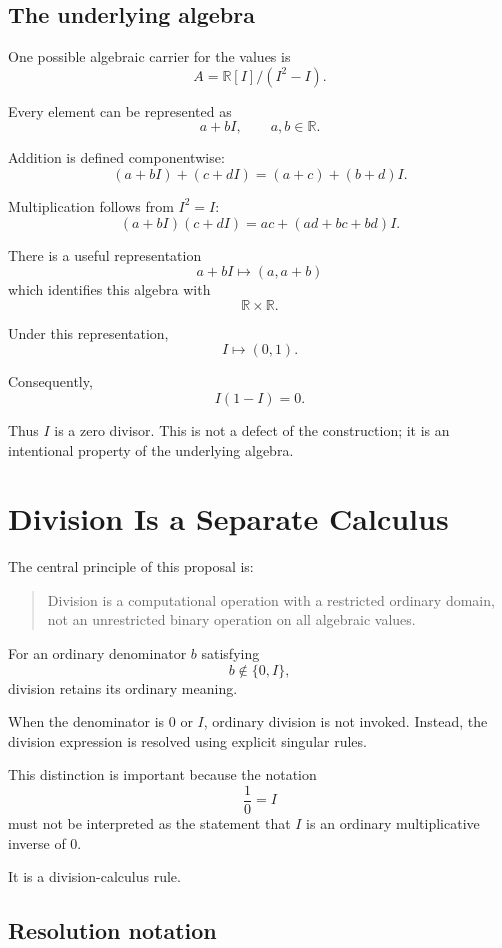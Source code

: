 \documentclass[11pt,a4paper]{article}
\begin{document}
\subsection{The underlying algebra}

One possible algebraic carrier for the values is
\[
A=\mathbb{R}[I]/(I^2-I).
\]

Every element can be represented as
\[
a+bI,\qquad a,b\in\mathbb{R}.
\]

Addition is defined componentwise:
\[
(a+bI)+(c+dI)
=
(a+c)+(b+d)I.
\]

Multiplication follows from $I^2=I$:
\[
(a+bI)(c+dI)
=
ac+(ad+bc+bd)I.
\]

There is a useful representation
\[
a+bI\longmapsto(a,a+b)
\]
which identifies this algebra with
\[
\mathbb{R}\times\mathbb{R}.
\]

Under this representation,
\[
I\longmapsto(0,1).
\]

Consequently,
\[
I(1-I)=0.
\]

Thus $I$ is a zero divisor. This is not a defect of the construction; it is an
intentional property of the underlying algebra.

\section{Division Is a Separate Calculus}

The central principle of this proposal is:

\begin{quote}
Division is a computational operation with a restricted ordinary domain,
not an unrestricted binary operation on all algebraic values.
\end{quote}

For an ordinary denominator $b$ satisfying
\[
b\notin\{0,I\},
\]
division retains its ordinary meaning.

When the denominator is $0$ or $I$, ordinary division is not invoked.
Instead, the division expression is resolved using explicit singular rules.

This distinction is important because the notation
\[
\frac{1}{0}=I
\]
must not be interpreted as the statement that $I$ is an ordinary
multiplicative inverse of $0$.

It is a division-calculus rule.

\subsection{Resolution notation}
\end{document}

